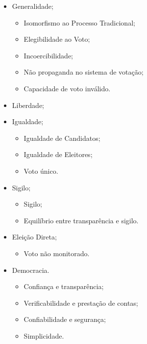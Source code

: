 \documentclass[portuguese]{textolivre}
\begin{document}
	\begin{itemize}
		\item Generalidade;
		\begin{itemize}
			\item Isomorfismo ao Processo Tradicional;
			\item Elegibilidade ao Voto;
			\item Incoercibilidade;
			\item Não propaganda no sistema de votação;
			\item Capacidade de voto inválido.
		\end{itemize}
		\item Liberdade;
		\item Igualdade;
		\begin{itemize}
			\item Igualdade de Candidatos;
			\item Igualdade de Eleitores;
			\item Voto único.
		\end{itemize}
		\item Sigilo;
		\begin{itemize}
			\item Sigilo;
			\item Equilíbrio entre transparência e sigilo.
		\end{itemize}
		\item Eleição Direta;
		\begin{itemize}
			\item Voto não monitorado.
		\end{itemize}
		\item Democracia.
		\begin{itemize}
			\item Confiança e transparência;
			\item Verificabilidade e prestação de contas;
			\item Confiabilidade e segurança;
			\item Simplicidade.
		\end{itemize}
	\end{itemize}
	
	
		
		
\end{document}
